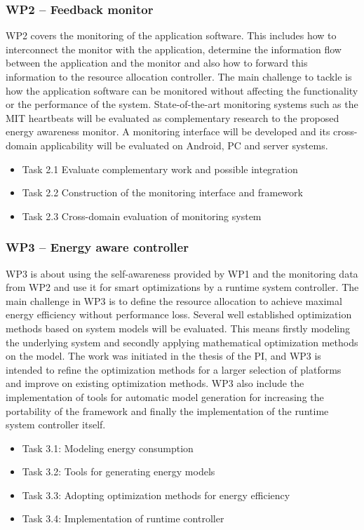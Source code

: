 \documentclass{article}
\begin{document}
\subsubsection{WP2 -- Feedback monitor}
WP2 covers the monitoring of the application software.
This includes how to interconnect the monitor with the application, determine the information flow between the application and the monitor and also how to forward this information to the resource allocation controller.
The main challenge to tackle is how the application software can be monitored without affecting the functionality or the performance of the system.
State-of-the-art monitoring systems such as the MIT heartbeats \cite{Hoffmann:10} will be evaluated as complementary research to the proposed energy awareness monitor.
A monitoring interface will be developed and its cross-domain applicability will be evaluated on Android, PC and server systems.
\begin{itemize}
\item Task 2.1 Evaluate complementary work and possible integration \vspace{-0.3cm}
\item Task 2.2 Construction of the monitoring interface and framework \vspace{-0.3cm}
\item Task 2.3 Cross-domain evaluation of monitoring system
\end{itemize}

\subsubsection{WP3 -- Energy aware controller}
WP3 is about using the self-awareness provided by WP1 and the monitoring data from WP2 and use it for smart optimizations by a runtime system controller.
The main challenge in WP3 is to define the resource allocation to achieve maximal energy efficiency without performance loss.
Several well established optimization methods based on system models will be evaluated.
This means firstly modeling the underlying system and secondly applying mathematical optimization methods on the model.
The work was initiated in the thesis of the PI, and WP3 is intended to refine the optimization methods for a larger selection of platforms and improve on existing optimization methods.
WP3 also include the implementation of tools for automatic model generation for increasing the portability of the framework and finally the implementation of the runtime system controller itself.
\begin{itemize}
 \item Task 3.1: Modeling energy consumption \vspace{-0.3cm}
 \item Task 3.2: Tools for generating energy models \vspace{-0.3cm}
 \item Task 3.3: Adopting optimization methods for energy efficiency \vspace{-0.3cm}
 \item Task 3.4: Implementation of runtime controller
\end{itemize}
\end{document}

